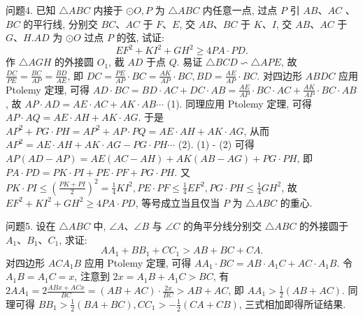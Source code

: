 问题4. 已知 $\triangle A B C$ 内接于 $\odot O, P$ 为 $\triangle A B C$ 内任意一点, 过点 $P$ 引 $A B 、 A C$ 、 $B C$ 的平行线, 分别交 $B C 、 A C$ 于 $F 、 E$, 交 $A B 、 B C$ 于 $K 、 I$, 交 $A B 、 A C$ 于 $G 、 H . A D$ 为 $\odot O$ 过点 $P$ 的弦, 试证:
$$
E F^2+K I^2+G H^2 \geqslant 4 P A \cdot P D .
$$
作 $\triangle A G H$ 的外接圆 $O_1$, 截 $A D$ 于点 $Q$. 易证 $\triangle B C D \backsim \triangle A P E$, 故 $\frac{D C}{P E}=\frac{B C}{A P}=\frac{B D}{A E}$, 即 $D C=\frac{P E}{A P} \cdot B C=\frac{A K}{A P} \cdot B C, B D=\frac{A E}{A P} \cdot B C$. 对四边形 $A B D C$ 应用 Ptolemy 定理, 可得 $A D \cdot B C=B D \cdot A C+D C \cdot A B=\frac{A E}{A P} \cdot B C \cdot A C+\frac{A K}{A P} \cdot B C \cdot A B$, 故 $A P \cdot A D=A E \cdot A C+A K \cdot A B \cdots$ (1). 同理应用 Ptolemy 定理, 可得 $A P \cdot A Q=A E \cdot A H+A K \cdot A G$. 于是 $A P^2+P G \cdot P H=A P^2+A P \cdot P Q=A E \cdot A H+A K \cdot A G$, 从而 $A P^2=A E \cdot A H+ A K \cdot A G-P G \cdot P H \cdots$ (2). (1) - (2) 可得 $A P(A D-A P)=A E(A C-A H)+ A K(A B-A G)+P G \cdot P H$, 即 $P A \cdot P D=P K \cdot P I+P E \cdot P F+P G \cdot P H$. 又 $P K \cdot P I \leqslant\left(\frac{P K+P I}{2}\right)^2=\frac{1}{4} K I^2, P E \cdot P F \leqslant \frac{1}{4} E F^2, P G \cdot P H \leqslant \frac{1}{4} G H^2$, 故 $E F^2+K I^2+G H^2 \geqslant 4 P A \cdot P D$, 等号成立当且仅当 $P$ 为 $\triangle A B C$ 的重心.



问题5. 设在 $\triangle A B C$ 中, $\angle A 、 \angle B$ 与 $\angle C$ 的角平分线分别交 $\triangle A B C$ 的外接圆于 $A_1 、 B_1 、 C_1$, 求证:
$$
A A_1+B B_1+C C_1>A B+B C+C A .
$$
对四边形 $A C A_1 B$ 应用 Ptolemy 定理, 可得 $A A_1 \cdot B C=A B \cdot A_1 C+ A C \cdot A_1 B$. 令 $A_1 B=A_1 C=x$, 注意到 $2 x=A_1 B+A_1 C>B C$, 有 $2 A A_1= 2 \frac{A B x+A C x}{B C}=(A B+A C) \cdot \frac{2 x}{B C}>A B+A C$, 即 $A A_1>\frac{1}{2}(A B+A C)$. 同理可得 $B B_1>\frac{1}{2}(B A+B C), C C_1>-\frac{1}{2}(C A+C B)$, 三式相加即得所证结果.


